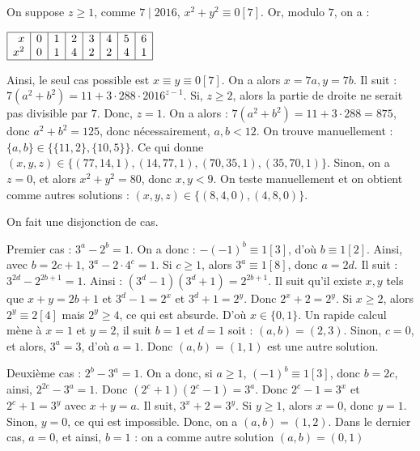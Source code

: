 \begin{sol}
On suppose $z\ge1$, comme $7\mid 2016$, $x^2+y^2\equiv0[7]$.
Or, modulo $7$, on a :
\begin{center}
$\begin{array}{|r|c|c|c|c|c|c|l|}
\hline
x & 0 & 1 & 2 & 3 & 4 & 5 & 6 \\
x^2 & 0 & 1 & 4 & 2 & 2 & 4 & 1 \\
\hline
\end{array}$
\end{center}

Ainsi, le seul cas possible est $x\equiv y \equiv 0[7]$. On a alors $x=7a,y=7b$. Il suit : $7(a^2+b^2)=11+3\cdot288\cdot 2016^{z-1}$. Si, $z\ge2$, alors la partie de droite ne serait pas divisible par $7$. Donc, $z=1$. On a alors : $7(a^2+b^2)=11+3\cdot288=875$, donc $a^2+b^2=125$, donc nécessairement, $a,b<12$.
On trouve manuellement : $\{a,b\}\in\{\{11,2\},\{10,5\} \}$.
Ce qui donne $(x,y,z)\in\{(77,14,1),(14,77,1),(70,35,1),(35,70,1)\}$.
Sinon, on a $z=0$, et alors $x^2+y^2=80$, donc $x,y<9$. On teste manuellement et on obtient comme autres solutions : $(x,y,z)\in\{(8,4,0),(4,8,0)\}$.
\end{sol}


\begin{sol}
On fait une disjonction de cas.

Premier cas :
$3^a-2^b=1$. On a donc : $-(-1)^b\equiv 1 [3]$, d'où $b\equiv 1 [2]$.
Ainsi, avec $b=2c+1$, $3^a-2\cdot4^c=1$. Si $c\ge1$, alors $3^a\equiv 1 [8]$, donc $a=2d$. Il suit : $3^{2d}-2^{2b+1}=1$.
Ainsi : $(3^d-1)(3^d+1)=2^{2b+1}$.
Il suit qu'il existe $x,y$ tels que $x+y=2b+1$ et $3^d-1=2^x$ et $3^d+1=2^y$. Donc $2^x+2=2^y$. Si $x\ge2$, alors $2^y\equiv2[4]$ mais $2^y\ge4$, ce qui est absurde. D'où $x\in\{0,1\}$.
Un rapide calcul mène à $x=1$ et $y=2$, il suit $b=1$ et $d=1$ soit : $(a,b)=(2,3)$.
Sinon, $c=0$, et alors, $3^a=3$, d'où $a=1$. Donc $(a,b)=(1,1)$ est une autre solution.

Deuxième cas :
$2^b-3^a=1$. On a donc, si $a\ge1$, $(-1)^b\equiv 1 [3]$, donc $b=2c$, ainsi, $2^{2c}-3^a=1$. Donc $(2^c+1)(2^c-1)=3^a$. Donc $2^c-1=3^x$ et $2^c+1=3^y$ avec $x+y=a$. Il suit, $3^x+2=3^y$. Si $y\ge1$, alors $x=0$, donc $y=1$. Sinon, $y=0$, ce qui est impossible.
Donc, on a $(a,b)=(1,2)$.
Dans le dernier cas, $a=0$, et ainsi, $b=1$ : on a comme autre solution $(a,b)=(0,1)$
\end{sol}



